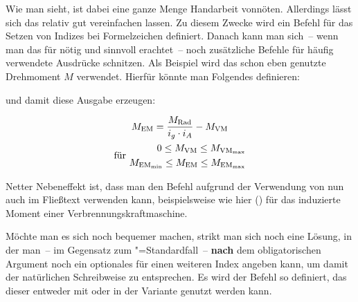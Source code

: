 \documentclass[english,ngerman]{tudscrartcl}
\begin{document}
Wie man sieht, ist dabei eine ganze Menge Handarbeit vonnöten. Allerdings lässt 
sich das relativ gut vereinfachen lassen. Zu diesem Zwecke wird ein Befehl 
\PParameter{\dots} für das Setzen von Indizes bei Formelzeichen 
definiert. Danach kann man sich~-- wenn man das für nötig und sinnvoll 
erachtet~-- noch zusätzliche Befehle für häufig verwendete Ausdrücke schnitzen. 
Als Beispiel wird das schon eben genutzte Drehmoment \ensuremath{M} verwendet. 
Hierfür könnte man Folgendes definieren:

\begin{Tutorial}
\newcommand*{\ind}[1]{\ensuremath{_\mathrm{#1}}}
\newcommand*{\M}[1]{\ensuremath{M\ind{#1}}}
\end{Tutorial}

und damit diese Ausgabe erzeugen:

\begin{Tutorial}
\begin{equation*}
\begin{gathered}
\M{EM} = \frac{\M{Rad}}{i_g \cdot i_A} - \M{VM} \\
\textrm{für }
\begin{aligned}
0\leq \M{VM}\leq \M{VM_{max}} \\ 
\M{EM_{min}}\leq \M{EM}\leq \M{EM_{max}}
\end{aligned}
\end{gathered}
\end{equation*}
\end{Tutorial}

Netter Nebeneffekt ist, dass man den Befehl aufgrund der Verwendung von 
\PParameter{\dots} nun auch im Fließtext verwenden kann, 
beispielsweise wie hier  () für 
das induzierte Moment einer Verbrennungskraftmaschine.

Möchte man es sich noch bequemer machen, strikt man sich noch eine Lösung, in
der man~-- im Gegensatz zum "=Standardfall~-- \textbf{nach} dem
obligatorischen Argument noch ein optionales für einen weiteren Index angeben
kann, um damit der natürlichen Schreibweise zu entsprechen. Es wird der Befehl 
 so definiert, das dieser entweder mit  
oder in der Variante  
genutzt 
werden kann.

\begin{Tutorial}
\renewcommand*{\ind}[1]{\ensuremath{_\mathrm{#1}}}
\makeatletter
\renewcommand*{\M}[1]{\@ifnextchar[{\o@M{#1}}{\n@M{#1}}}
\newcommand*{\n@M}{}
\newcommand*{\o@M}{}
\def\n@M#1{\ensuremath{M\ind{#1}}}
\def\o@M#1[#2]{\ensuremath{M\ind{#1_{#2}}}}
\makeatother
\end{Tutorial}
\end{document}
